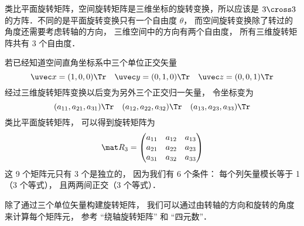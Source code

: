 


类比平面旋转矩阵，空间旋转矩阵是三维坐标的旋转变换，所以应该是 $3 \cross 3$ 的方阵．不同的是平面旋转变换只有一个自由度 $\theta $， 而空间旋转变换除了转过的角度还需要考虑转轴的方向， 三维空间中的方向有两个自由度， 所有三维旋转矩阵共有 3 个自由度．

若已经知道空间直角坐标系中三个单位正交矢量
\begin{equation}
\uvec x=(1,0,0)\Tr \quad \uvec y=(0,1,0)\Tr \quad \uvec z=(0,0,1)\Tr
\end{equation}
经过三维旋转矩阵变换以后变为另外三个正交归一矢量， 令坐标变为 
\begin{equation}
({a_{11}},{a_{21}},{a_{31}})\Tr \quad ({a_{12}},{a_{22}},{a_{32}})\Tr \quad ({a_{13}},{a_{23}},{a_{33}})\Tr
\end{equation}
类比平面旋转矩阵， 可以得到旋转矩阵为
\begin{equation}
\mat R_3 = \begin{pmatrix}
{a_{11}}&{a_{12}}&{a_{13}}\\
{a_{21}}&{a_{22}}&{a_{23}}\\
{a_{31}}&{a_{32}}&{a_{33}}
\end{pmatrix}\end{equation}
这 9 个矩阵元只有 3 个是独立的， 因为我们有 6 个条件： 每个列矢量模长等于 1（3 个等式）， 且两两间正交（3 个等式）．

除了通过三个单位矢量构建旋转矩阵， 我们可以通过由转轴的方向和旋转的角度来计算每个矩阵元， 参考 “绕轴旋转矩阵” 和 “四元数”．


